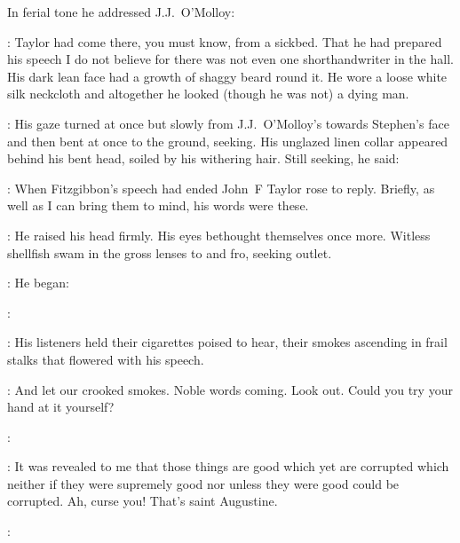 In ferial tone
he addressed J.J.~O'Molloy:

\machugh:
Taylor had come there,
you must know,
from a sickbed.
That he had prepared his speech I do not believe
for there was not even one shorthandwriter in the hall.
His dark lean face had a growth of shaggy beard round it.
He wore a loose white silk neckcloth
and altogether he looked (though he was not)
a dying man.

:
His gaze turned at once but slowly from J.J.~O'Molloy's
towards Stephen's face
and then bent at once to the ground,
seeking.
His unglazed linen collar appeared behind his bent head,
soiled by his withering hair.
Still seeking,
he said:

\machugh:
When Fitzgibbon's speech had ended
John~F Taylor rose to reply.
Briefly, as well as I can bring them to mind,
his words were these.

:
He raised his head firmly.
His eyes bethought themselves once more.
Witless shellfish swam in the gross lenses to and fro,
seeking outlet.

:
He began:

\machugh:

:
His listeners held their cigarettes poised to hear,
their smokes ascending in frail stalks that flowered with his speech.

\StephenInt:
And let our crooked smokes.
Noble words coming.
Look out.
Could you try your hand at it yourself?

\machugh:



\StephenInt:
It was revealed to me
that those things are good which yet are corrupted
which neither if they were supremely good
nor unless they were good could be corrupted.
Ah, curse you!
That's saint Augustine.

\machugh:

